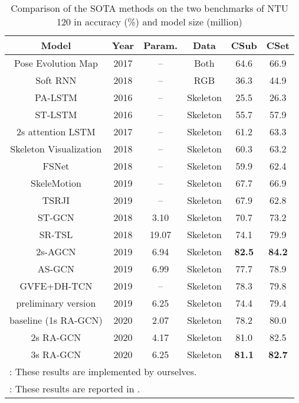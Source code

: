 \documentclass[journal]{IEEEtran}
\begin{document}
\begin{table}[t]
\caption{Comparison of the SOTA methods on the two benchmarks of NTU 120 in accuracy (\%) and model size (million)}
\label{tab:ntu120}
\centering
\begin{tabular}{cc|cc|cc}
\hline
Model & Year & Param. & Data & CSub & CSet \\
\hline
Pose Evolution Map \cite{liu2018recognizing} & 2017 & -- & Both & 64.6 & 66.9 \\
Soft RNN \cite{hu2018early} & 2018 & -- & RGB & 36.3 & 44.9 \\
\hline
\hline
PA-LSTM \cite{shahroudy2016ntu} & 2016 & -- & Skeleton & 25.5 & 26.3 \\
ST-LSTM \cite{liu2016spatio} & 2016 & -- & Skeleton & 55.7 & 57.9 \\
2s attention LSTM \cite{liu2017skeleton} & 2017 & -- & Skeleton & 61.2 & 63.3 \\
Skeleton Visualization \cite{liu2018enhanced} & 2018 & -- & Skeleton & 60.3 & 63.2 \\
FSNet \cite{liu2018skeleton} & 2018 & -- & Skeleton & 59.9 & 62.4 \\
SkeleMotion \cite{caetano2019skelemotion} & 2019 & -- & Skeleton & 67.7 & 66.9 \\
TSRJI \cite{caetano2019skeleton} & 2019 & -- & Skeleton & 67.9 & 62.8 \\
\hline
ST-GCN \cite{yan2018spatial} & 2018 & 3.10 & Skeleton & 70.7 & 73.2 \\
SR-TSL \cite{si2018skeleton} & 2018 & 19.07 & Skeleton & 74.1 & 79.9 \\
2s-AGCN \cite{shi2019two} & 2019 & 6.94 & Skeleton & {\bf 82.5} & {\bf 84.2} \\
AS-GCN \cite{li2019actional} & 2019 & 6.99 & Skeleton & 77.7 & 78.9 \\
GVFE+DH-TCN \cite{papadopoulos2019vertex} & 2019 & -- & Skeleton & 78.3 & 79.8 \\
\hline
preliminary version \cite{song2019richly} & 2019 & 6.25 & Skeleton & 74.4 & 79.4 \\
baseline (1s RA-GCN) & 2020 & 2.07 & Skeleton & 78.2 & 80.0 \\
2s RA-GCN & 2020 & 4.17 & Skeleton & 81.0 & 82.5 \\
3s RA-GCN & 2020 & 6.25 & Skeleton & {\bf 81.1} & {\bf 82.7} \\
\hline
\multicolumn{6}{l}{: These results are implemented by ourselves.} \\
\multicolumn{6}{l}{: These results are reported in \cite{papadopoulos2019vertex}.} \\
\end{tabular}
\vspace{-0.4cm}
\end{table}
\end{document}
